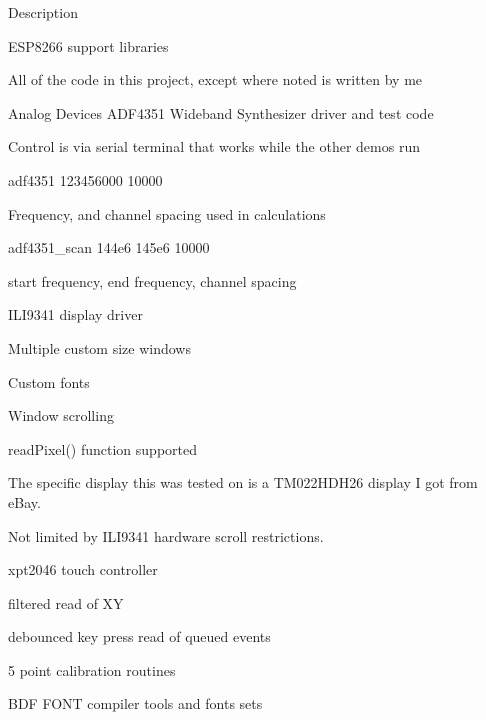 \begin{DoxyParagraph}{Description}

\begin{DoxyItemize}
\item E\+S\+P8266 support libraries
\begin{DoxyItemize}
\item All of the code in this project, except where noted is written by me
\item Analog Devices A\+D\+F4351 Wideband Synthesizer driver and test code
\begin{DoxyItemize}
\item Control is via serial terminal that works while the other demos run
\item adf4351 123456000 10000
\begin{DoxyItemize}
\item Frequency, and channel spacing used in calculations
\end{DoxyItemize}
\item adf4351\+\_\+scan 144e6 145e6 10000
\begin{DoxyItemize}
\item start frequency, end frequency, channel spacing
\end{DoxyItemize}
\end{DoxyItemize}
\item I\+L\+I9341 display driver
\begin{DoxyItemize}
\item Multiple custom size windows
\item Custom fonts
\item Window scrolling
\item read\+Pixel() function supported
\item The specific display this was tested on is a T\+M022\+H\+D\+H26 display I got from e\+Bay.
\item Not limited by I\+L\+I9341 hardware scroll restrictions.
\end{DoxyItemize}
\item xpt2046 touch controller
\begin{DoxyItemize}
\item filtered read of XY
\item debounced key press read of queued events
\item 5 point calibration routines
\end{DoxyItemize}
\item B\+DF F\+O\+NT compiler tools and fonts sets
\begin{DoxyItemize}

\end{DoxyItemize}
\end{DoxyItemize}
\end{DoxyItemize}
\end{DoxyParagraph}
